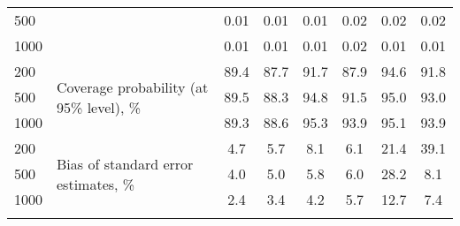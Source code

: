 \documentclass[letterpaper,fleqn,11pt]{article}
\begin{document}
\begin{table}[htbp]
\begin{tabular}{rrcccccc}
\multicolumn{1}{l}{500} & \multicolumn{1}{l}{} & 0.01 & 0.01 & 0.01 & 0.02 & 
0.02 & 0.02 \\ 
\multicolumn{1}{l}{1000} & \multicolumn{1}{l}{} & 0.01 & 0.01 & 0.01 & 0.02
& 0.01 & 0.01 \\ 
\multicolumn{1}{l}{200} & \multicolumn{1}{l}{\multirow{3}[2]{4cm}{Coverage
probability (at 95\% level), \%}} & 89.4 & 87.7 & 91.7 & 87.9 & 94.6 & 91.8
\\ 
\multicolumn{1}{l}{500} & \multicolumn{1}{l}{} & 89.5 & 88.3 & 94.8 & 91.5 & 
95.0 & 93.0 \\ 
\multicolumn{1}{l}{1000} & \multicolumn{1}{l}{} & 89.3 & 88.6 & 95.3 & 93.9
& 95.1 & 93.9 \\ 
\multicolumn{1}{l}{200} & \multicolumn{1}{l}{\multirow{3}[2]{4cm}{Bias of
standard error estimates, \%}} & 4.7 & 5.7 & 8.1 & 6.1 & 21.4 & 39.1 \\ 
\multicolumn{1}{l}{500} & \multicolumn{1}{l}{} & 4.0 & 5.0 & 5.8 & 6.0 & 28.2
& 8.1 \\ 
\multicolumn{1}{l}{1000} & \multicolumn{1}{l}{} & 2.4 & 3.4 & 4.2 & 5.7 & 
12.7 & 7.4 \\ 
\bottomrule \bottomrule &  &  &  &  &  &  & 
\end{tabular}%
\end{table}
\end{document}
